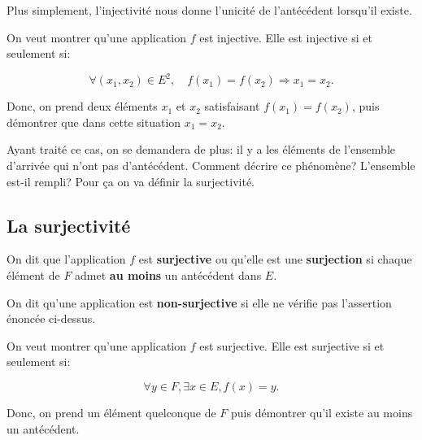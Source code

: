 \documentclass{article}
\begin{document}
Plus simplement, l'injectivité nous donne l'unicité de l'antécédent lorsqu'il existe.



\begin{tcolorbox}[colback=green!5!white,colframe=green!75!black,title=Point méthode 3.1]

On veut montrer qu'une application $f$ est injective. Elle est injective si et seulement si:

\[
\forall (x_1, x_2) \in E^2, \quad f(x_1) = f(x_2) \Rightarrow x_1 = x_2.
\]

Donc, on prend deux éléments $x_{1}$ et $x_{2}$ satisfaisant $f(x_1) = f(x_2)$, puis démontrer que dans cette situation $x_1 = x_2$.



\end{tcolorbox}




Ayant traité ce cas, on se demandera de plus: il y a les éléments de l'ensemble d'arrivée qui n'ont pas d'antécédent. Comment décrire ce phénomène? L'ensemble est-il rempli? Pour \c ca on va définir la surjectivité.






\subsection{La surjectivité}

\begin{tcolorbox}[colback=red!5!white,colframe=red!75!black,title=Définition 3.4]

On dit que l'application $f$ est \textbf{surjective} ou qu'elle est une \textbf{surjection} si chaque élément de $F$ admet \textbf{au moins} un antécédent dans $E$.

\tcblower

On dit qu'une application est \textbf{non-surjective} si elle ne vérifie pas l'assertion énoncée ci-dessus.

\end{tcolorbox}


\begin{tcolorbox}[colback=green!5!white,colframe=green!75!black,title=Point méthode 3.2]

On veut montrer qu'une application $f$ est surjective. Elle est surjective si et seulement si:

\[
\forall y \in F, \exists x \in E,  f(x) = y.
\]

Donc, on prend un élément quelconque de $F$ puis démontrer qu'il existe au moins un antécédent.



\end{tcolorbox}
\end{document}
